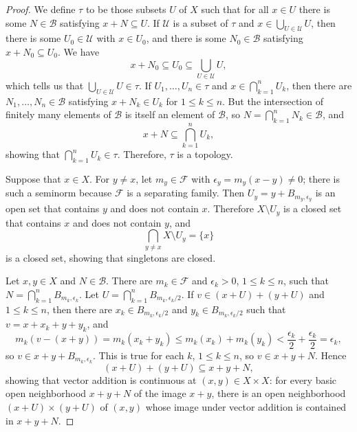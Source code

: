 \documentclass{article}
\begin{document}
\begin{proof}
We define $\tau$ to be those subsets $U$ of $X$ such that for all $x \in U$  there is some 
$N \in \mathscr{B}$ satisfying $x+N \subseteq U$. If $\mathscr{U}$ is a subset of $\tau$ and 
$x \in \bigcup_{U \in \mathscr{U}} U$, then 
there is some $U_0 \in \mathscr{U}$ with $x \in U_0$, and there is some $N_0 \in \mathscr{B}$ satisfying
$x+N_0 \subseteq U_0$. We have
\[
x+N_0 \subseteq U_0 \subseteq \bigcup_{U \in \mathscr{U}} U,
\]
which tells us that $\bigcup_{U \in \mathscr{U}}  U \in \tau$. If $U_1,\ldots,U_n \in \tau$ and
$x \in \bigcap_{k=1}^n U_k$, then there are $N_1,\ldots,N_n \in \mathscr{B}$ satisfying
$x + N_k \in U_k$ for $1 \leq k \leq n$. But the intersection of finitely many elements of $\mathscr{B}$ is itself an element
of $\mathscr{B}$, so $N=\bigcap_{k=1}^n N_k \in \mathscr{B}$, and 
\[
x+N \subseteq \bigcap_{k=1}^n U_k,
\]
showing that $\bigcap_{k=1}^n U_k \in \tau$. Therefore, $\tau$ is a topology.

Suppose that $x \in X$. For $y \neq x$, let $m_y \in \mathscr{F}$ with $\epsilon_y=m_y(x-y) \neq 0$; there is such a seminorm because $\mathscr{F}$ is
a separating family.
Then
$U_y=y+B_{m_y,\epsilon_y}$ is an open set that contains $y$ and does not contain $x$. Therefore $X \setminus U_y$ is a closed set that contains $x$ and does not contain $y$, 
and 
\[
\bigcap_{y \neq x} X \setminus U_y = \{x\}
\]
is a closed set, showing that singletons are closed.


Let $x,y \in X$ and $N \in \mathscr{B}$. There are  $m_k \in \mathscr{F}$ and $\epsilon_k>0$, $1 \leq k \leq n$, such that
$N = \bigcap_{k=1}^n B_{m_k,\epsilon_k}$. Let $U = \bigcap_{k=1}^n B_{m_k,\epsilon_k/2}$. If $v \in (x+U) + (y+U)$ and
$1 \leq k \leq n$, then there are $x_k \in B_{m_k,\epsilon_k/2}$ and $y_k \in B_{m_k,\epsilon_k/2}$ such that
$v = x+x_k + y + y_k$, and
\[
m_k(v-(x+y)) = m_k(x_k+y_k) \leq m_k(x_k)+ m_k(y_k) < \frac{\epsilon_k}{2}+\frac{\epsilon_k}{2} = \epsilon_k,
\]
so $v \in x+y+B_{m_k,\epsilon_k}$. This is true for each $k$, $1 \leq k \leq n$, so $v \in x+y+N$. Hence
\[
(x+U)+(y+U) \subseteq x+y+N,
\]
showing that vector addition is continuous at $(x,y) \in X \times X$: for every basic open neighborhood $x+y+N$ of the image $x+y$, there
is an open neighborhood $(x+U) \times (y+U)$ of $(x,y)$ whose image under vector addition is contained in $x+y+N$. 


\end{proof}
\end{document}
